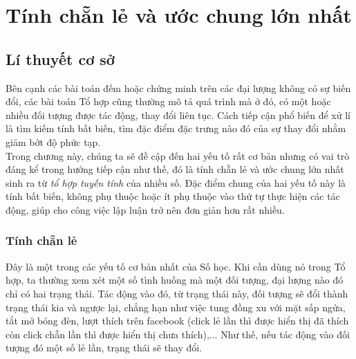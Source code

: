 
\section{Tính chẵn lẻ và ước chung lớn nhất}
\subsection{Lí thuyết cơ sở}	
\noindent Bên cạnh các bài toán đếm hoặc chứng minh trên các đại lượng không có sự biến đổi, các bài toán Tổ hợp cũng thường mô tả quá trình mà ở đó, có một hoặc nhiều đối tượng được tác động, thay đổi liên tục. Cách tiếp cận phổ biến để xử lí là tìm kiếm tính bất biến, tìm đặc điểm đặc trưng nào đó của sự thay đổi nhằm giảm bớt độ phức tạp.\\
Trong chương này, chúng ta sẽ đề cập đến hai yếu tố rất cơ bản nhưng có vai trò đáng kể trong hướng tiếp cận như thế, đó là tính chẵn lẻ và ước chung lớn nhất sinh ra từ \textit{tổ hợp tuyến tính} của nhiều số. Đặc điểm chung của hai yếu tố này là tính bất biến, không phụ thuộc hoặc ít phụ thuộc vào thứ tự thực hiện các tác động, giúp cho công việc lập luận trở nên đơn giản hơn rất nhiều.
\subsubsection{Tính chẵn lẻ}
\noindent Đây là một trong các yếu tố cơ bản nhất của Số học. Khi cần dùng nó trong Tổ hợp, ta thường xem xét một số tình huống mà một đối tượng, đại lượng nào đó chỉ có hai trạng thái. Tác động vào đó, từ trạng thái này, đối tượng sẽ đổi thành trạng thái kia và ngược lại, chẳng hạn như việc tung đồng xu với mặt sấp ngửa, tắt mở bóng đèn, lượt thích trên facebook (click lẻ lần thì được hiển thị đã thích còn click chẵn lần thì được hiển thị chưa thích),... Như thế, nếu tác động vào đối tượng đó một số lẻ lần, trạng thái sẽ thay đổi.
